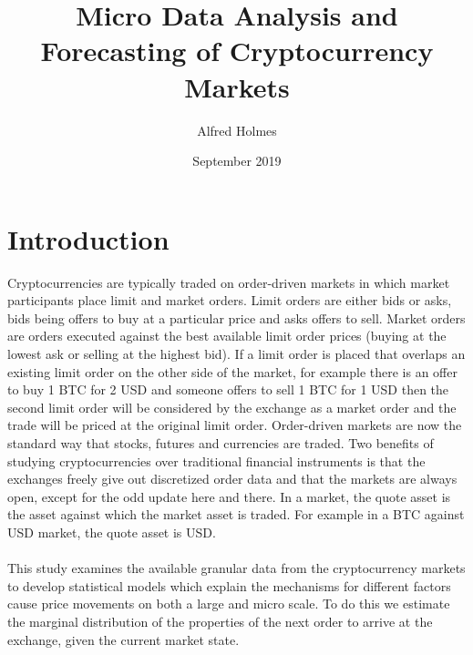 \documentclass[a4paper,10pt]{article}
\title{Micro Data Analysis and Forecasting of Cryptocurrency Markets}
\author{Alfred Holmes}
\date{September 2019}
\begin{document}
\maketitle
{}

\tableofcontents
\section{Introduction}
Cryptocurrencies are typically traded on order-driven markets in which market participants place limit and market orders. Limit orders are either bids or asks, bids being offers to buy at a particular price and asks offers to sell. Market orders are orders executed against the best available limit order prices (buying at the lowest ask or selling at the highest bid). If a limit order is placed that overlaps an existing limit order on the other side of the market, for example there is an offer to buy 1 BTC for 2 USD and someone offers to sell 1 BTC for 1 USD then the second limit order will be considered by the exchange as a market order and the trade will be priced at the original limit order. Order-driven markets are now the standard way that stocks, futures and currencies are traded. Two benefits of studying cryptocurrencies over traditional financial instruments is that the exchanges freely give out discretized order data and that the markets are always open, except for the odd update here and there. In a market, the quote asset is the asset against which the market asset is traded. For example in a BTC against USD market, the quote asset is USD.\\ \\
This study examines the available granular data from the cryptocurrency markets to develop statistical models which explain the mechanisms for different factors cause price movements on both a large and micro scale. To do this we estimate the marginal distribution of the properties of the next order to arrive at the exchange, given the current market state. \\ \\
\end{document}

